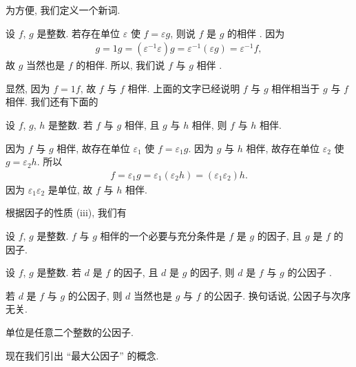 为方便, 我们定义一个新词.

\begin{definition}
    设 $f$, $g$ 是整数. 若存在单位 $\varepsilon$ 使 $f = \varepsilon g$, 则说 $f$ 是 $g$ 的相伴 . 因为
    \begin{align*}
        g = 1g = (\varepsilon^{-1} \varepsilon) g = \varepsilon^{-1} (\varepsilon g) = \varepsilon^{-1} f,
    \end{align*}
    故 $g$ 当然也是 $f$ 的相伴. 所以, 我们说 $f$ 与 $g$ 相伴 .
\end{definition}

显然, 因为 $f = 1f$, 故 $f$ 与 $f$ 相伴. 上面的文字已经说明 $f$ 与 $g$ 相伴相当于 $g$ 与 $f$ 相伴. 我们还有下面的
\begin{proposition}
    设 $f$, $g$, $h$ 是整数. 若 $f$ 与 $g$ 相伴, 且 $g$ 与 $h$ 相伴, 则 $f$ 与 $h$ 相伴.
\end{proposition}

\begin{pf}
    因为 $f$ 与 $g$ 相伴, 故存在单位 $\varepsilon_1$ 使 $f = \varepsilon_1 g$. 因为 $g$ 与 $h$ 相伴, 故存在单位 $\varepsilon_2$ 使 $g = \varepsilon_2 h$. 所以
    \begin{align*}
        f = \varepsilon_1 g = \varepsilon_1 (\varepsilon_2 h) = (\varepsilon_1 \varepsilon_2) h.
    \end{align*}
    因为 $\varepsilon_1 \varepsilon_2$ 是单位, 故 $f$ 与 $h$ 相伴.
\end{pf}

根据因子的性质 (iii), 我们有
\begin{proposition}
    设 $f$, $g$ 是整数. $f$ 与 $g$ 相伴的一个必要与充分条件是 $f$ 是 $g$ 的因子, 且 $g$ 是 $f$ 的因子.
\end{proposition}

\begin{definition}
    设 $f$, $g$ 是整数. 若 $d$ 是 $f$ 的因子, 且 $d$ 是 $g$ 的因子, 则 $d$ 是 $f$ 与 $g$ 的公因子 .
\end{definition}

\begin{remark}
    若 $d$ 是 $f$ 与 $g$ 的公因子, 则 $d$ 当然也是 $g$ 与 $f$ 的公因子. 换句话说, 公因子与次序无关.
\end{remark}

\begin{example}
    单位是任意二个整数的公因子.
\end{example}

现在我们引出 ``最大公因子'' 的概念.

